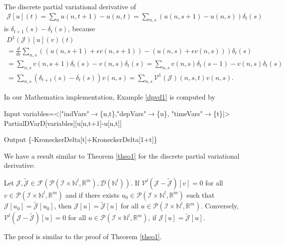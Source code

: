\documentclass[runningheads]{llncs}
\newcommand{\Rr}{\mathbb{R}}
\newcommand{\Nn}{\mathbb{N}}
\newcommand{\1}{\chi}
\newcommand{\Ii}{\mathcal{I}}
\begin{document}
\begin{example}
	\label{dpvd1}
	The discrete partial variational derivative of 
	\begin{gather*}
		\mathcal{J}[u](t)=\sum_nu(n,t+1)-u(n,t)=\sum_{n,s}(u(n,s+1)-u(n,s))\delta_t(s)
	\end{gather*}
	is $\delta_{t+1}(s)-\delta_t(s)$, because
	\small
	\begin{gather*}
		D^1(\mathcal{J})[u](v)(t)\\
		=\frac{d}{d\epsilon} \sum_{n,s}((u(n,s+1)+\epsilon v(n,s+1))-(u(n,s)+\epsilon v(n,s)))\delta_t(s)\\
		=\sum_{n,s}v(n,s+1)\delta_t(s)-v(n,s)\delta_t(s)=\sum_{n,s}v(n,s)\delta_t(s-1)-v(n,s)\delta_t(s)\\
		=\sum_{n,s}(\delta_{t+1}(s)-\delta_t(s))v(n,s)=\sum_{n,s}\mathcal{V}^1(\mathcal{J})(n,s,t)v(n,s).
	\end{gather*}
	\normalsize
\end{example}
\begin{example}
	In our {\sc Mathematica} implementation, Example \ref{dpvd1} is computed by
		
	\begin{small}
		\begin{mmaCell}[moredefined={variables, expression, PartialDVarD}]{Input}
  variables=<|"indVars"\(\pmb{\to}\)\{n,t\},"depVars"\(\pmb{\to}\)\{u\},
  "timeVars"\(\pmb{\to}\)\{t\}|>
  PartialDVarD[variables][u[n,t+1]-u[n,t]]
  
\end{mmaCell}
		\begin{mmaCell}{Output}
  \{-KroneckerDelta[t]+KroneckerDelta[1+t]\}
\end{mmaCell}
	\end{small}
\end{example}
We have a result similar to Theorem \ref{theo1} for the discrete partial variational derivative:
\begin{theorem}\label{theo2}
	Let $\mathcal{J},\tilde{\mathcal{J}}\in \mathcal{F}(\mathcal{P}(\Ii\times\Nn^l,\Rr^m),\mathcal{D}(\Nn^l))$. If $\mathcal{V}^l(\mathcal{J}-\tilde{\mathcal{J}})[v]=0$ for all $v\in\mathcal{P}(\Ii\times\Nn^l,\Rr^m)$ and if there exists $u_0\in\mathcal{P}(\Ii\times\Nn^l,\Rr^m)$ such that $\mathcal{J}[u_0]=\tilde{\mathcal{J}}[u_0]$, then
	$\mathcal{J}[u]=\tilde{\mathcal{J}}[u]$
	for all $u\in\mathcal{P}(\Ii\times\Nn^l,\Rr^m)$.
	Conversely,
	$\mathcal{V}^l(\mathcal{J}-\tilde{\mathcal{J}})[u]=0$
	for all $u\in\mathcal{P}(\Ii\times\Nn^l,\Rr^m)$, if $\mathcal{J}[u]=\tilde{\mathcal{J}}[u]$.
\end{theorem}
The proof is similar to the proof of Theorem \ref{theo1}.
\end{document}
